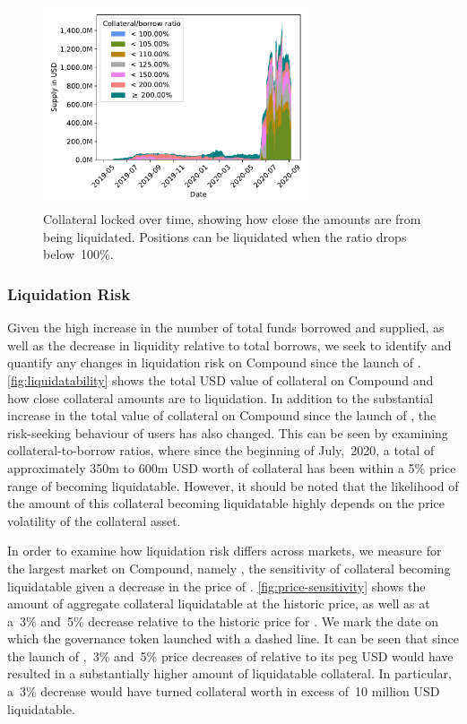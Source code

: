 \begin{figure}[tbp]
	\centering
	\includegraphics[width=0.7\textwidth]{./5b-economic-security/figures/supply-borrow-over-time.pdf}
	\caption[Collateral locked on Compound over time]{Collateral locked over time, showing how close the amounts are from being liquidated. Positions can be liquidated when the ratio drops below~100\%.}
	\label{fig:liquidatability}
\end{figure}

\subsubsection{Liquidation Risk}
Given the high increase in the number of total funds borrowed and supplied, as well as the decrease in liquidity relative to total borrows, we seek to identify and quantify any changes in liquidation risk on Compound since the launch of .
\autoref{fig:liquidatability} shows the total USD value of collateral on Compound and how close collateral amounts are to liquidation.
In addition to the substantial increase in the total value of collateral on Compound since the launch of , the risk-seeking behaviour of users has also changed.
This can be seen by examining collateral-to-borrow ratios, where since the beginning of July,~2020, a total of approximately 350m to 600m USD worth of collateral has been within a 5\% price range of becoming liquidatable.
However, it should be noted that the likelihood of the amount of this collateral becoming liquidatable highly depends on the price volatility of the collateral asset.

In order to examine how liquidation risk differs across markets, we measure for the largest market on Compound, namely , the sensitivity of collateral becoming liquidatable given a decrease in the price of .
\autoref{fig:price-sensitivity} shows the amount of aggregate collateral liquidatable at the historic price, as well as at a~3\% and~5\% decrease relative to the historic price for .
We mark the date on which the  governance token launched with a dashed line.
It can be seen that since the launch of ,~3\% and~5\% price decreases of  relative to its peg USD would have resulted in a substantially higher amount of liquidatable collateral.
In particular, a~3\% decrease would have turned collateral worth in excess of~10 million USD liquidatable.

